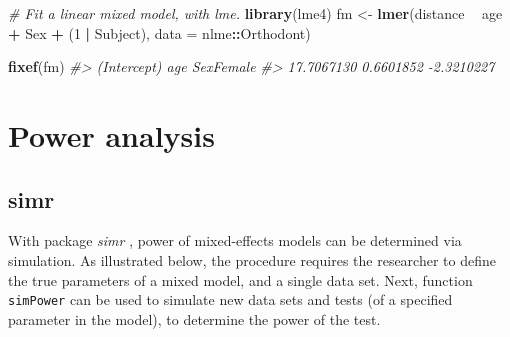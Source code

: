 \documentclass[]{book}
\newenvironment{Shaded}{\begin{snugshade}}{\end{snugshade}}
\newcommand{\KeywordTok}[1]{\textcolor[rgb]{0.13,0.29,0.53}{\textbf{#1}}}
\newcommand{\DataTypeTok}[1]{\textcolor[rgb]{0.13,0.29,0.53}{#1}}
\newcommand{\DecValTok}[1]{\textcolor[rgb]{0.00,0.00,0.81}{#1}}
\newcommand{\StringTok}[1]{\textcolor[rgb]{0.31,0.60,0.02}{#1}}
\newcommand{\CommentTok}[1]{\textcolor[rgb]{0.56,0.35,0.01}{\textit{#1}}}
\newcommand{\OperatorTok}[1]{\textcolor[rgb]{0.81,0.36,0.00}{\textbf{#1}}}
\newcommand{\NormalTok}[1]{#1}
\begin{document}
\begin{Shaded}
\begin{Highlighting}[]
\CommentTok{# Fit a linear mixed model, with lme.}
\KeywordTok{library}\NormalTok{(lme4)}
\NormalTok{fm <-}\StringTok{ }\KeywordTok{lmer}\NormalTok{(distance }\OperatorTok{~}\StringTok{ }\NormalTok{age }\OperatorTok{+}\StringTok{ }\NormalTok{Sex }\OperatorTok{+}\StringTok{ }\NormalTok{(}\DecValTok{1} \OperatorTok{|}\StringTok{ }\NormalTok{Subject), }\DataTypeTok{data =}\NormalTok{ nlme}\OperatorTok{::}\NormalTok{Orthodont)}

\KeywordTok{fixef}\NormalTok{(fm)}
\CommentTok{#> (Intercept)         age   SexFemale }
\CommentTok{#>  17.7067130   0.6601852  -2.3210227}
\end{Highlighting}
\end{Shaded}

\section{Power analysis}\label{power-analysis}

\subsection{simr}\label{simr}


With package \emph{simr} \citep{Green2016}, power of mixed-effects
models can be determined via simulation. As illustrated below, the
procedure requires the researcher to define the true parameters of a
mixed model, and a single data set. Next, function \texttt{simPower} can
be used to simulate new data sets and tests (of a specified parameter in
the model), to determine the power of the test.
\end{document}
